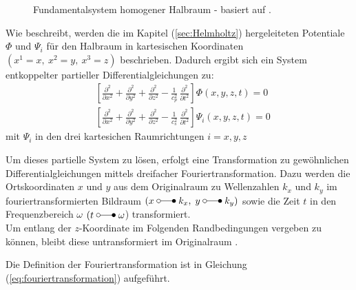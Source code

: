 \begin{figure}[H]
	\hspace*{45mm}
	
	\caption{Fundamentalsystem homogener Halbraum - basiert auf \citep{Freisinger2022}.}
	\label{fig:cha09_hs}
\end{figure}
Wie \cite{Fruehe2010} beschreibt, werden die im Kapitel (\ref{sec:Helmholtz}) hergeleiteten Potentiale $\Phi$ und $\Psi_{i}$ für den Halbraum in kartesischen Koordinaten \((x^1 = x,\ x^2 = y,\ x^3 = z)\) beschrieben. Dadurch ergibt sich ein System entkoppelter partieller Differentialgleichungen zu:
\begin{subequations}\label{eq:partielle_DGL}
		\begin{align}
			&\left[\frac{\partial^{2}}{\partial x^{2}}
			+ \frac{\partial^{2}}{\partial y^{2}}
			+ \frac{\partial^{2}}{\partial z^{2}}
			- \frac{1}{c_p^{2}}\,\frac{\partial^{2}}{\partial t^{2}}\right]
			\Phi(x,y,z,t) = 0
			\label{eq:phi_wave} \\[6pt]
			&\left[\frac{\partial^{2}}{\partial x^{2}}
			+ \frac{\partial^{2}}{\partial y^{2}}
			+ \frac{\partial^{2}}{\partial z^{2}}
			- \frac{1}{c_s^{2}}\,\frac{\partial^{2}}{\partial t^{2}}\right]
			\Psi_{i}(x,y,z,t) = 0
			\label{eq:psi_wave}
		\end{align}
\end{subequations}
mit $\Psi_{i}$ in den drei kartesichen Raumrichtungen \( i = x, y, z\)

Um dieses partielle System zu lösen, erfolgt eine Transformation zu gewöhnlichen Differentialgleichungen mittels dreifacher Fouriertransformation. 
Dazu werden die Ortskoordinaten $x$ und $y$ aus dem Originalraum zu Wellenzahlen \(k_x\) und \(k_y\) im fouriertransformierten Bildraum \((x \mapto k_x,\; y \mapto k_y)\) sowie die Zeit $t$ in den Frequenzbereich $\omega$ \((t \mapto \omega\)) transformiert.\\
Um entlang der $z$-Koordinate  im Folgenden Randbedingungen vergeben zu können, bleibt diese untransformiert im Originalraum \citep{Mueller2007}.

Die Definition der Fouriertransformation ist in Gleichung (\ref{eq:fouriertransformation}) aufgeführt.

